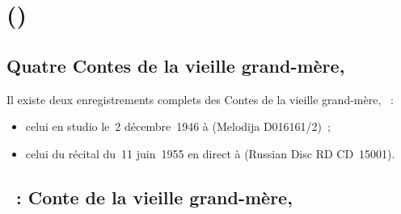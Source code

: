 \chapter[%
Sergej Prokof'ev (\Dates{1891-04-23}{1953-03-05})][%
Sergej Prokof'ev]{%
\SProkofiev{} ()}
\label{chap:Prokofiev}

\section*{%
Quatre Contes de la vieille grand-mère, }

Il existe deux enregistrements complets des Contes de la vieille grand-mère,
~:
\begin{itemize}
 \item
 celui en studio le~2 décembre~1946 à \Moscow (Melodija D016161/2)~;
 \item
 celui du récital du~11 juin~1955 en direct à \MSHM (Russian Disc
 RD CD~15001).
\end{itemize}

\section{\ifChrono \Prokofiev{}~: \fi
Conte de la vieille grand-mère,  }
\label{\thesection}

\begin{workitemize}
 \item{}
 \begin{perfitemize}
  \item{}
  \item{}
 \end{perfitemize}
 \item{}
 \begin{perfitemize}
  \item{}
 \end{perfitemize}
\end{workitemize}

